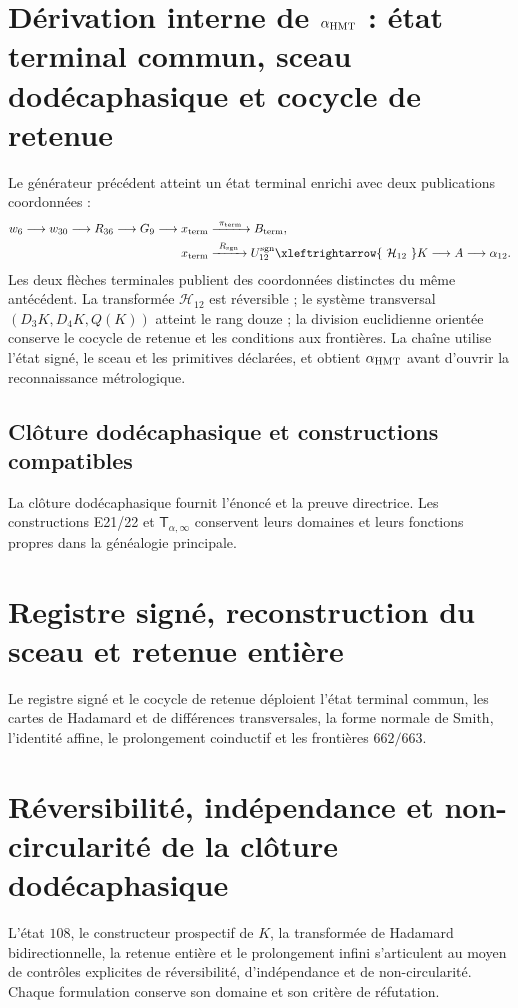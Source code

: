 \label{chap:p3-83-25-alpha}

\section[Dérivation interne de \texorpdfstring{\(\alpha_{\rm HMT}\)}{alpha HMT}]
{Dérivation interne de \texorpdfstring{\(\alpha_{\rm HMT}\)}{alpha HMT} :
état terminal commun, sceau dodécaphasique et cocycle de retenue}
\label{p3-83-c25-s1:chap:parte-iii-alpha-hmt}

Le générateur précédent atteint un état terminal enrichi avec deux
publications coordonnées :
\[
\begin{aligned}
w_6\longrightarrow w_{30}\longrightarrow R_{36}\longrightarrow G_9
\longrightarrow x_{\rm term}
&\xrightarrow{\ \pi_{\rm term}\ }B_{\rm term},\\
x_{\rm term}
&\xrightarrow{\ R_{\rm sgn}\ }U_{12}^{\rm sgn}
\xleftrightarrow{\ \mathcal H_{12}\ }K
\longrightarrow A\longrightarrow\alpha_{12}.
\end{aligned}
\]
Les deux flèches terminales publient des coordonnées distinctes du même antécédent.
La transformée \(\mathcal H_{12}\) est réversible ; le système transversal
\((D_3K,D_4K,Q(K))\) atteint le rang douze ; la division euclidienne orientée conserve
le cocycle de retenue et les conditions aux frontières. La chaîne utilise
l’état signé, le sceau et les primitives déclarées, et obtient
\(\alpha_{\rm HMT}\) avant d’ouvrir la reconnaissance métrologique.

\subsection{Clôture dodécaphasique et constructions compatibles}
La clôture dodécaphasique fournit l’énoncé et la preuve directrice. Les
constructions E21/22 et \(\mathsf T_{\alpha,\infty}\) conservent leurs domaines et leurs
fonctions propres dans la généalogie principale.


\section{Registre signé, reconstruction du sceau et retenue entière}
Le registre signé et le cocycle de retenue déploient l’état terminal
commun, les cartes de Hadamard et de différences transversales, la forme normale de
Smith, l’identité affine, le prolongement coinductif et les frontières
\(662/663\).


\section{Réversibilité, indépendance et non-circularité de la clôture dodécaphasique}
L’état \(108\), le constructeur prospectif de \(K\), la transformée de
Hadamard bidirectionnelle, la retenue entière et le prolongement infini
s’articulent au moyen de contrôles explicites de réversibilité, d’indépendance et de
non-circularité. Chaque formulation conserve son domaine et son critère de
réfutation.


